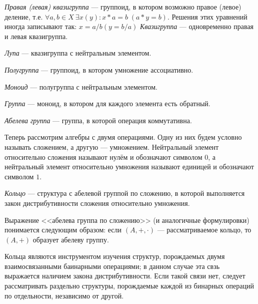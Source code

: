 \begin{definition}
    \textit{Правая (левая) квазигруппа} --- группоид, в котором возможно правое (левое) деление, т.е. $\forall a, b \in X\ \exists x (y): x * a = b \; (a * y = b)$. Решения этих уравнений иногда записывают так: $x = a / b (y = b / a)$  \textit{Квазигруппа} --- одновременно правая и левая квазигруппа.
\end{definition}

\begin{definition}
    \textit{Лупа} --- квазигруппа с нейтральным элементом.
\end{definition}

\begin{definition}
    \textit{Полугруппа} --- группоид, в котором умножение ассоциативно.
\end{definition}

\begin{definition}
    \textit{Моноид} --- полугруппа с нейтральным элементом.
\end{definition}

\begin{definition}
    \textit{Группа} --- моноид, в котором для каждого элемента есть обратный.
\end{definition}

\begin{definition}
    \textit{Абелева группа} --- группа, в которой операция коммутативна.
\end{definition}

Теперь рассмотрим алгебры с двумя операциями. Одну из них будем условно называть сложением, а другую --- умножением. Нейтральный элемент относительно сложения называют нулём и обозначают символом $0$, а нейтральный элемент относительно умножения называют единицей и обозначают символом $1$.

\begin{definition}
    \textit{Кольцо} --- структура с абелевой группой по сложению, в которой выполняется закон дистрибутивности сложения относительно умножения.
\end{definition}

\begin{remark}
    Выражение <<абелева группа по сложению>> (и аналогичные формулировки) понимается следующим образом: если $(A,+,\cdot)$ --- рассматриваемое кольцо, то $(A,+)$ образует абелеву группу.
\end{remark}

Кольца являются инструментом изучения структур, порождаемых двумя взаимосвязанными баинарными операциями; в данном случае эта свзь выражается наличием закона дистрибутивности. Если такой связи нет, следует рассматривать раздельно структуры, порождаемые каждой из бинарных операций по отдельности, независимо от другой.

